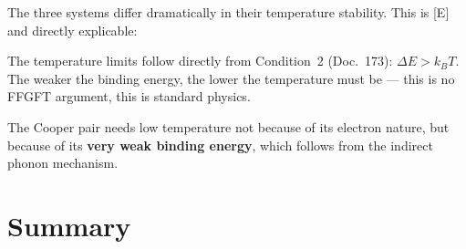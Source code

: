 The three systems differ dramatically in their
temperature stability. This is [E] and directly explicable:

\begin{center}
\end{center}

\begin{keypoint}
The temperature limits follow directly from Condition~2
(Doc.~173): $\Delta E > k_BT$.
The weaker the binding energy, the lower
the temperature must be --- this is no FFGFT argument,
this is standard physics.

The Cooper pair needs low temperature not because of
its electron nature, but because of its
\textbf{very weak binding energy},
which follows from the indirect phonon mechanism.
\end{keypoint}

\section{Summary}
\label{sec:summary-179}

